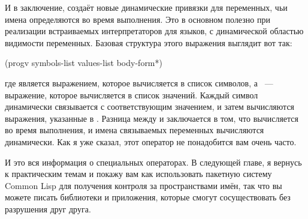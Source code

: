И в заключение,  создаёт новые динамические привязки для переменных, чьи имена
определяются во время выполнения.  Это в основном полезно при реализации встраиваемых
интерпретаторов для языков, с динамической областью видимости переменных.  Базовая
структура этого выражения выглядит вот так:

\begin{myverb}
(progv symbols-list values-list
  body-form*)
\end{myverb}

\noindent{}где  является выражением, которое вычисляется в список символов, а
~--- выражение, которое вычисляется в список значений.  Каждый символ
динамически связывается с соответствующим значением, и затем вычисляются выражения,
указанные в .  Разница между  и  заключается в том,
что  вычисляется во время выполнения, и имена связываемых переменных
вычисляются динамически.  Как я уже сказал, этот оператор не понадобится вам очень часто.

И это вся информация о специальных операторах.  В следующей главе, я вернусь к
практическим темам и покажу вам как использовать пакетную систему Common Lisp для
получения контроля за пространствами имён, так что вы можете писать библиотеки и
приложения, которые смогут сосуществовать без разрушения друг друга.

